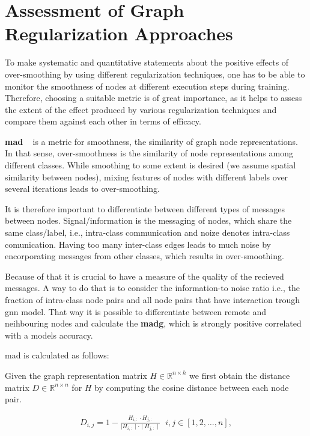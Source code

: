 \section{Assessment of Graph Regularization Approaches}
\label{sec:related:setup:choice:metrics}
To make systematic and quantitative statements about the positive effects of over-smoothing by using different regularization techniques, one has to be able to monitor the smoothness of nodes at different execution steps during training. Therefore, choosing a suitable metric is of great importance, as it helps to assess the extent of the effect produced by various regularization techniques and compare them against each other in terms of efficacy.

\textbf{\Ac{mad}} ~\cite{Chen2020} is a metric for smoothness, the similarity of graph node representations. In that sense, over-smoothness is the similarity of node representations among different classes. While smoothing to some extent is desired (we assume spatial similarity between nodes), mixing features of nodes with different labels over several iterations leads to over-smoothing.

It is therefore important to differentiate between different types of messages between nodes. Signal/information is the messaging of nodes, which share the same class/label, i.e., intra-class communication and noize denotes intra-class comunication. Having too many inter-class edges leads to much noise by encorporating messages from other classes, which results in over-smoothing.

Because of that it is crucial to have a measure of the quality of the recieved messages. A way to do that is to consider the information-to noise ratio i.e., the fraction of intra-class node pairs and all node pairs that have interaction trough \ac{gnn} model. That way it is possible to differentiate between remote and neihbouring nodes and calculate the \textbf{\ac{madg}}, which is strongly positive correlated with a models accuracy.

\ac{mad} is calculated as follows:

Given the graph representation matrix $H \in \mathbb{R}^{n \times h}$ we
first obtain the distance matrix $D \in \mathbb{R}^{n \times n}$ for $H$ by
computing the cosine distance between each node pair.

\begin{align*}
    D_{i,j} = 1 - \frac{H_{i,:} \cdot H_{j,:}}{\mid H_{i,:}\mid  \cdot \mid H_{j,:}\mid} \; \;  i,j \in [1,2, \dots, n],
\end{align*}

